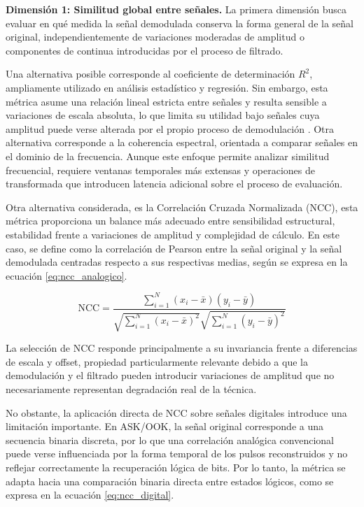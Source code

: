 \textbf{Dimensión 1: Similitud global entre señales.}  
La primera dimensión busca evaluar en qué medida la señal demodulada conserva la forma general de la señal original, independientemente de variaciones moderadas de amplitud o componentes de continua introducidas por el proceso de filtrado.

Una alternativa posible corresponde al coeficiente de determinación $R^2$, ampliamente utilizado en análisis estadístico y regresión. Sin embargo, esta métrica asume una relación lineal estricta entre señales y resulta sensible a variaciones de escala absoluta, lo que limita su utilidad bajo señales cuya amplitud puede verse alterada por el propio proceso de demodulación \cite{kay1993fundamentals}. Otra alternativa corresponde a la coherencia espectral, orientada a comparar señales en el dominio de la frecuencia. Aunque este enfoque permite analizar similitud frecuencial, requiere ventanas temporales más extensas y operaciones de transformada que introducen latencia adicional sobre el proceso de evaluación.

Otra alternativa considerada, es la Correlación Cruzada Normalizada (NCC), esta métrica proporciona un balance más adecuado entre sensibilidad estructural, estabilidad frente a variaciones de amplitud y complejidad de cálculo. En este caso, se define como la correlación de Pearson entre la señal original y la señal demodulada centradas respecto a sus respectivas medias, según se expresa en la ecuación \ref{eq:ncc_analogico}.

\begin{equation}
\text{NCC} = \frac{\displaystyle\sum_{i=1}^{N}(x_i - \bar{x})(y_i - \bar{y})}
{\sqrt{\displaystyle\sum_{i=1}^{N}(x_i - \bar{x})^2}
\sqrt{\displaystyle\sum_{i=1}^{N}(y_i - \bar{y})^2}}
\label{eq:ncc_analogico}
\end{equation}

La selección de NCC responde principalmente a su invariancia frente a diferencias de escala y offset, propiedad particularmente relevante debido a que la demodulación y el filtrado pueden introducir variaciones de amplitud que no necesariamente representan degradación real de la técnica.

No obstante, la aplicación directa de NCC sobre señales digitales introduce una limitación importante. En ASK/OOK, la señal original corresponde a una secuencia binaria discreta, por lo que una correlación analógica convencional puede verse influenciada por la forma temporal de los pulsos reconstruidos y no reflejar correctamente la recuperación lógica de bits. Por lo tanto, la métrica se adapta hacia una comparación binaria directa entre estados lógicos, como se expresa en la ecuación \ref{eq:ncc_digital}.

